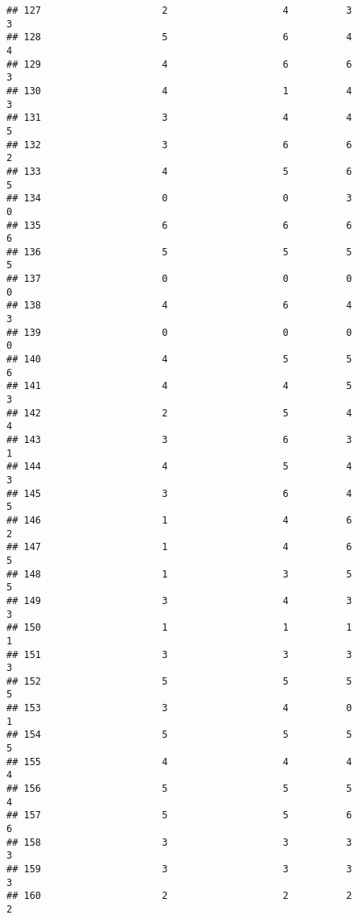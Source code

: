 \documentclass[
]{article}
\begin{document}
\begin{verbatim}
## 127                     2                    4          3               3
## 128                     5                    6          4               4
## 129                     4                    6          6               3
## 130                     4                    1          4               3
## 131                     3                    4          4               5
## 132                     3                    6          6               2
## 133                     4                    5          6               5
## 134                     0                    0          3               0
## 135                     6                    6          6               6
## 136                     5                    5          5               5
## 137                     0                    0          0               0
## 138                     4                    6          4               3
## 139                     0                    0          0               0
## 140                     4                    5          5               6
## 141                     4                    4          5               3
## 142                     2                    5          4               4
## 143                     3                    6          3               1
## 144                     4                    5          4               3
## 145                     3                    6          4               5
## 146                     1                    4          6               2
## 147                     1                    4          6               5
## 148                     1                    3          5               5
## 149                     3                    4          3               3
## 150                     1                    1          1               1
## 151                     3                    3          3               3
## 152                     5                    5          5               5
## 153                     3                    4          0               1
## 154                     5                    5          5               5
## 155                     4                    4          4               4
## 156                     5                    5          5               4
## 157                     5                    5          6               6
## 158                     3                    3          3               3
## 159                     3                    3          3               3
## 160                     2                    2          2               2

\end{verbatim}
\end{document}
